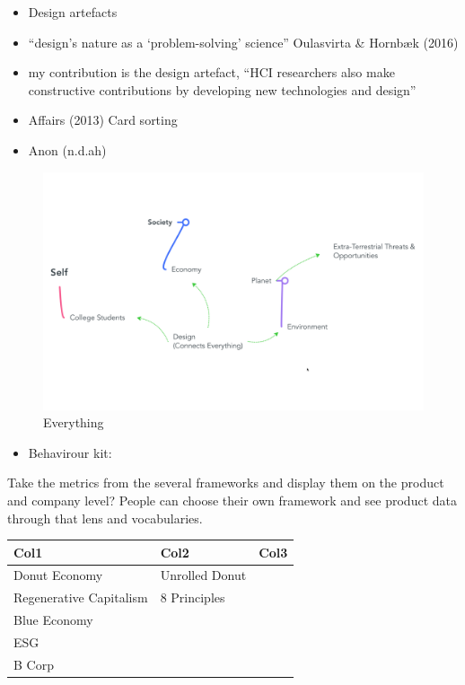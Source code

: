 \documentclass[
  letterpaper,
  DIV=11,
  numbers=noendperiod]{scrartcl}
\providecommand{\tightlist}{%
  \setlength{\itemsep}{0pt}\setlength{\parskip}{0pt}}\usepackage{longtable,booktabs,array}
\begin{document}
\begin{itemize}
\item
  Design artefacts
\item
  ``design's nature as a `problem-solving' science'' Oulasvirta \&
  Hornbæk (2016)
\item
  my contribution is the design artefact, ``HCI researchers also make
  constructive contributions by developing new technologies and design''
\item
  Affairs (2013) Card sorting
\item
  Anon (n.d.ah)
\end{itemize}

\begin{figure}[H]

{\centering \includegraphics[width=1\textwidth,height=\textheight]{./images/discussion/everything.png}

}

\caption{Everything}

\end{figure}%

\begin{itemize}
\tightlist
\item
  Behavirour kit:
\end{itemize}

Take the metrics from the several frameworks and display them on the
product and company level? People can choose their own framework and see
product data through that lens and vocabularies.

\begin{longtable}[]{@{}lll@{}}
\toprule\noalign{}
Col1 & Col2 & Col3 \\
\midrule\noalign{}
\endhead
\bottomrule\noalign{}
\endlastfoot
Donut Economy & Unrolled Donut & \\
Regenerative Capitalism & 8 Principles & \\
Blue Economy & & \\
ESG & & \\
B Corp & & \\
\end{longtable}
\end{document}
